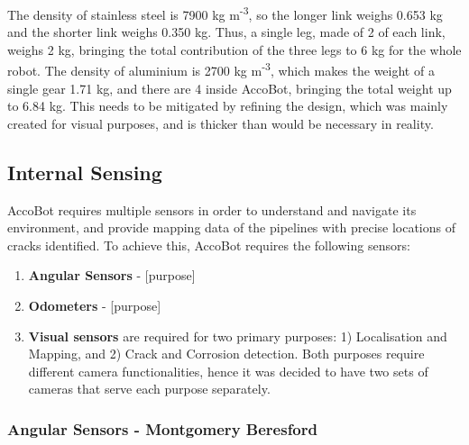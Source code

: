 \documentclass[11pt]{article}		%
\newcommand{\supercite}[1]{\textsuperscript{\cite{#1}}}		%
\begin{document}
				The density of stainless steel is 7900 kg m\textsuperscript{-3}\supercite{HLT}, so the longer link weighs 0.653 kg and the shorter link weighs 0.350 kg.
				Thus, a single leg, made of 2 of each link, weighs 2 kg, bringing the total contribution of the three legs to 6 kg for the whole robot.
				The density of aluminium is 2700 kg m\textsuperscript{-3}\supercite{HLT}, which makes the weight of a single gear 1.71 kg, and there are 4 inside AccoBot, bringing the total weight up to 6.84 kg.
				This needs to be mitigated by refining the design, which was mainly created for visual purposes, and is thicker than would be necessary in reality.
			
		\subsection[Internal Sensing]{Internal Sensing}
		
		AccoBot requires multiple sensors in order to understand and navigate its environment, and provide mapping data of the pipelines with precise locations of cracks identified. To achieve this, AccoBot requires the following sensors:
		
		\begin{enumerate}
		    \item \textbf{Angular Sensors} - [purpose]
		    \item \textbf{Odometers} - [purpose]
		    \item \textbf{Visual sensors} are required for two primary purposes: 1) Localisation and Mapping, and 2) Crack and Corrosion detection. Both purposes require different camera functionalities, hence it was decided to have two sets of cameras that serve each purpose separately.
		\end{enumerate}
		
		\subsubsection{Angular Sensors - Montgomery Beresford}
            		
\end{document}
